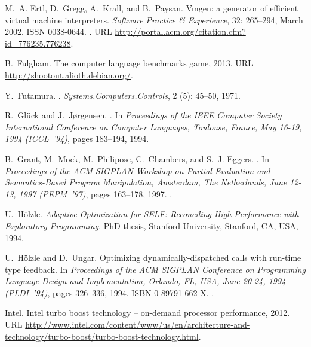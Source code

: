 \documentclass[preprint,10pt]{popl14conf}
\begin{document}
\begin{thebibliography}{46}
M.~A. Ertl, D.~Gregg, A.~Krall, and B.~Paysan.
\newblock Vmgen: a generator of efficient virtual machine interpreters.
\newblock \emph{Software Practice \& Experience}, 32: 265--294, March
  2002.
\newblock ISSN 0038-0644.
\newblock {}.
\newblock URL \url{http://portal.acm.org/citation.cfm?id=776235.776238}.

B.~Fulgham.
\newblock The computer language benchmarks game, 2013.
\newblock URL \url{http://shootout.alioth.debian.org/}.

Y.~Futamura.
.
\newblock \emph{Systems.Computers.Controls}, 2 (5): 45--50,
  1971.

R.~Gl{\"u}ck and J.~J{\o}rgensen.
.
\newblock In \emph{Proceedings of the IEEE Computer Society International
  Conference on Computer Languages, Toulouse, France, May 16-19, 1994
  (ICCL~'94)}, pages 183--194, 1994.

B.~Grant, M.~Mock, M.~Philipose, C.~Chambers, and S.~J. Eggers.
.
\newblock In \emph{Proceedings of the {ACM SIGPLAN Workshop on Partial
  Evaluation and Semantics-Based Program Manipulation}, Amsterdam, The
  Netherlands, June 12-13, 1997 (PEPM~'97)}, pages 163--178, 1997.
\newblock {}.

U.~H{\"o}lzle.
\newblock \emph{Adaptive Optimization for {SELF}: Reconciling High Performance
  with Exploratory Programming}.
\newblock PhD thesis, Stanford University, Stanford, CA, USA, 1994.

U.~H\"{o}lzle and D.~Ungar.
\newblock Optimizing dynamically-dispatched calls with run-time type feedback.
\newblock In \emph{Proceedings of the {ACM SIGPLAN Conference on Programming
  Language Design and Implementation}, Orlando, FL, USA, June 20-24, 1994
  (PLDI~'94)}, pages 326--336, 1994.
\newblock ISBN 0-89791-662-X.
\newblock {}.

Intel.
\newblock Intel turbo boost technology -- on-demand processor performance,
  2012.
\newblock URL
  \url{http://www.intel.com/content/www/us/en/architecture-and-technology/turbo-boost/turbo-boost-technology.html}.


\end{thebibliography}
\end{document}
